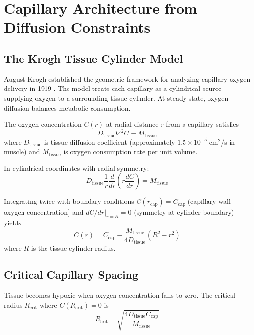 \section{Capillary Architecture from Diffusion Constraints}
\label{sec:capillary}

\subsection{The Krogh Tissue Cylinder Model}

August Krogh established the geometric framework for analyzing capillary oxygen delivery in 1919 \cite{krogh1919number}. The model treats each capillary as a cylindrical source supplying oxygen to a surrounding tissue cylinder. At steady state, oxygen diffusion balances metabolic consumption.

The oxygen concentration $C(r)$ at radial distance $r$ from a capillary satisfies
\begin{equation}
D_{\mathrm{tissue}} \nabla^{2} C = M_{\mathrm{tissue}}
\end{equation}
where $D_{\mathrm{tissue}}$ is tissue diffusion coefficient (approximately $1.5 \times 10^{-5}$ cm$^{2}$/s in muscle) and $M_{\mathrm{tissue}}$ is oxygen consumption rate per unit volume.

In cylindrical coordinates with radial symmetry:
\begin{equation}
D_{\mathrm{tissue}} \frac{1}{r} \frac{d}{dr}\left(r \frac{dC}{dr}\right) = M_{\mathrm{tissue}}
\end{equation}

Integrating twice with boundary conditions $C(r_{\mathrm{cap}}) = C_{\mathrm{cap}}$ (capillary wall oxygen concentration) and $dC/dr|_{r=R} = 0$ (symmetry at cylinder boundary) yields
\begin{equation}
C(r) = C_{\mathrm{cap}} - \frac{M_{\mathrm{tissue}}}{4D_{\mathrm{tissue}}}(R^{2} - r^{2})
\label{eq:krogh}
\end{equation}
where $R$ is the tissue cylinder radius.

\subsection{Critical Capillary Spacing}

Tissue becomes hypoxic when oxygen concentration falls to zero. The critical radius $R_{\mathrm{crit}}$ where $C(R_{\mathrm{crit}}) = 0$ is
\begin{equation}
R_{\mathrm{crit}} = \sqrt{\frac{4D_{\mathrm{tissue}} C_{\mathrm{cap}}}{M_{\mathrm{tissue}}}}
\end{equation}

